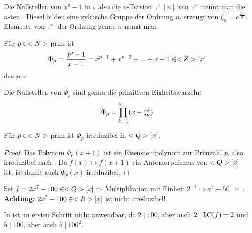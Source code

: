 \begin{remark}
	Die Nullstellen von $x^n-1$ in $\comp$, also die $n$-Torsion $\comp^\times[n]$ von $\comp^\times$ nennt man die $n$-ten . Diesel bilden eine zyklische Gruppe der Ordnung $n$, erzeugt von $\zeta_n = e^{\frac{2\pi i}{n}}$. Elemente von $\comp^\times$ der Ordnung genau $n$ nennt man .
	
	\begin{center}
	\end{center}
\end{remark}

\begin{definition}
	Für $p\in<N>$ prim ist
	\begin{align}
		\Phi_p = \frac{x^p-1}{x-1} = x^{p-1} + x^{p-2} + ... + x + 1\in<Z>[x]\notag
	\end{align}
	das $p$-te .
\end{definition}

\begin{remark}
	Die Nullstellen von $\Phi_p$ sind genau die primitiven Einheitswurzeln:
	\begin{align}
		\Phi_p = \prod_{k=1}^{p-1} (x-\zeta_p^k)\notag
	\end{align}
\end{remark}

\begin{proposition}
	Für $p\in<N>$ prim ist $\Phi_p$ irreduzibel in $<Q>[x]$.
\end{proposition}
\begin{proof}
	Das Polynom $\Phi_p(x+1)$ ist ein Eisensteinpolynom zur Primzahl $p$, also irreduzibel nach . Da $f(x)\mapsto f(x+1)$ ein Automorphismus von $<Q>[x]$ ist, ist damit auch $\Phi_p(x)$ irreduzibel.
\end{proof}

\begin{example}
	Sei $f=2x^7-100\in <Q>[x]\Rightarrow$ Multiplikation mit Einheit $2^{-1}\Rightarrow x^7-50\Rightarrow$ . \\
	\textbf{Achtung:} $2x^7-100\in<R>[x]$ ist nicht irreduzibel!
\end{example}

\begin{*anmerkung}
	In  ist  im ersten Schritt nicht anwendbar, da $2\mid 100$, aber auch $2\mid \operatorname{LC}(f)=2$ und $5\mid 100$, aber auch $5\mid 100^2$.
\end{*anmerkung}